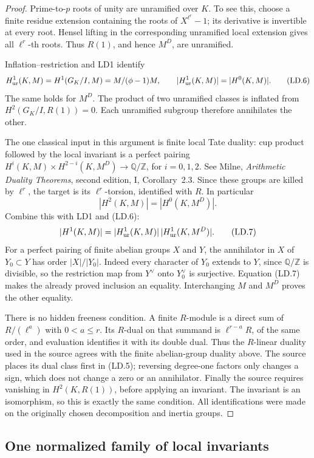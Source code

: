 \begin{proof}
Prime-to-$p$ roots of unity are unramified over $K$.  To see this,
choose a finite residue extension containing the roots of
$X^{\ell^r}-1$; its derivative is invertible at every root.  Hensel
lifting in the corresponding unramified local extension gives all
$\ell^r$-th roots.  Thus $R(1)$, and hence $M^D$, are unramified.

Inflation--restriction and LD1 identify
\[
 H^1_{\rm ur}(K,M)=H^1(G_K/I,M)=M/(\phi-1)M,
 \qquad |H^1_{\rm ur}(K,M)|=|H^0(K,M)|.
 \tag{LD.6}
\]
The same holds for $M^D$.  The product of two unramified classes is
inflated from $H^2(G_K/I,R(1))=0$.  Each unramified subgroup therefore
annihilates the other.

The one classical input in this argument is finite local Tate duality:
cup product followed by the local invariant is a perfect pairing
$H^i(K,M)\times H^{2-i}(K,M^D)\to\mathbb Q/\mathbb Z$,
for $i=0,1,2$.  See Milne, \emph{Arithmetic Duality Theorems},
second edition, I, Corollary~2.3.  Since these groups are killed by
$\ell^r$, the target is its $\ell^r$-torsion, identified with $R$.
In particular
\[
 |H^2(K,M)|=|H^0(K,M^D)|.
\]
Combine this with LD1 and (LD.6):
\[
 |H^1(K,M)|=
 |H^1_{\rm ur}(K,M)|\,|H^1_{\rm ur}(K,M^D)|.
 \tag{LD.7}
\]
For a perfect pairing of finite abelian groups $X$ and $Y$, the
annihilator in $X$ of $Y_0\subset Y$ has order $|X|/|Y_0|$.
Indeed every character of $Y_0$ extends to $Y$, since
$\mathbb Q/\mathbb Z$ is divisible, so the restriction map from
$Y^\vee$ onto $Y_0^\vee$ is surjective.  Equation (LD.7) makes the
already proved inclusion an equality.  Interchanging $M$ and $M^D$
proves the other equality.

There is no hidden freeness condition.  A finite $R$-module is a direct
sum of $R/(\ell^a)$ with $0<a\le r$.  Its $R$-dual on that summand is
$\ell^{r-a}R$, of the same order, and evaluation identifies it with
its double dual.  Thus the $R$-linear duality used in the source agrees
with the finite abelian-group duality above.  The source places its
dual class first in (LD.5); reversing degree-one factors only changes
a sign, which does not change a zero or an annihilator.  Finally the
source requires vanishing in $H^2(K,R(1))$, before applying an
invariant.  The invariant is an isomorphism, so this is exactly the
same condition.  All identifications were made on the originally
chosen decomposition and inertia groups.
\end{proof}

\subsection{One normalized family of local invariants}

